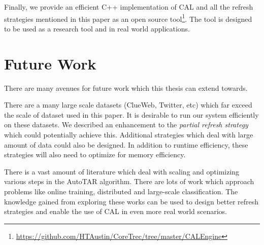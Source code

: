 Finally, we provide an efficient C++ implementation of CAL and all the refresh
strategies mentioned in this paper as an open source
tool\footnote{\url{https://github.com/HTAustin/CoreTrec/tree/master/CALEngine}}. The tool is designed
to be used as a research tool and in real world applications.


\section{Future Work}

There are many avenues for future work which this thesis can extend towards.

There are a many large scale datasets (ClueWeb, Twitter, etc) which far exceed
the scale of dataset used in this paper.  It is desirable to run our system
efficiently on these datasets. We described an enhancement to the
\textit{partial refresh strategy} which could potentially achieve this.
Additional strategies which deal with large amount of data could also be
designed. In addition to runtime efficiency, these strategies will also need to
optimize for memory
efficiency.

There is a vast amount of literature which deal with scaling and optimizing
various steps in the AutoTAR algorithm. There are lots of work which approach
problems like online training, distributed and large-scale classification. The
knowledge gained from exploring these works can be used to design better refresh
strategies and enable the use of CAL in even more real world scenarios.
